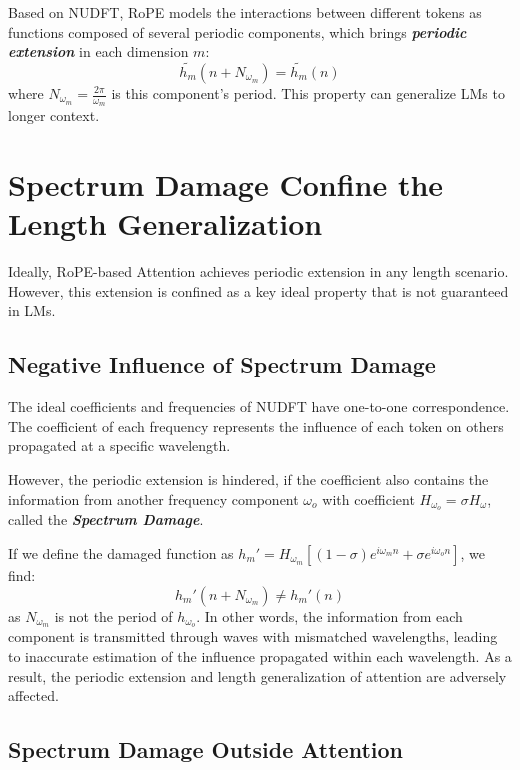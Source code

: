 Based on NUDFT, RoPE models the interactions between different tokens as functions composed of several periodic components, which brings \textbf{\textit{periodic extension}} in each dimension $m$:
\begin{equation}\label{eq:periodic}
    \widetilde{h_m}(n+N_{\omega_m}) =  \widetilde{h_m}(n)
\end{equation}
where $N_{\omega_m}=\frac{2\pi}{\omega_m}$ is this component's period. This property can generalize LMs to longer context.

\section{Spectrum Damage Confine the Length Generalization}
\label{sec:spectrum_damage}
Ideally, RoPE-based Attention achieves periodic extension in any length scenario. However, this extension is confined as a key ideal property that is not guaranteed in LMs.

\subsection{Negative Influence of Spectrum Damage}
The ideal coefficients and frequencies of NUDFT have one-to-one correspondence. The coefficient of each frequency represents the influence of each token on others propagated at a specific wavelength.

However, the periodic extension is hindered, if the coefficient also contains the information from another frequency component $\omega_o$ with coefficient $H_{\omega_o}=\sigma H_\omega$, called the \textbf{\textit{Spectrum Damage}}. 

If we define the damaged function as $h_{m}' = H_{\omega_m}[(1-\sigma)e^{i\omega_m n}+\sigma e^{i\omega_o n}]$, we find:
\begin{equation}\label{eq:spectrum_damage}
    h_{m}'(n+N_{\omega_m}) \neq h_{m}'(n)
\end{equation}
as $N_{\omega_m}$ is not the period of $h_{\omega_o}$. 
In other words, the information from each component is transmitted through waves with mismatched wavelengths, leading to inaccurate estimation of the influence propagated within each wavelength. As a result, the periodic extension and length generalization of attention are adversely affected.

\subsection{Spectrum Damage Outside Attention}
\label{subsec:spectrum_damage}

